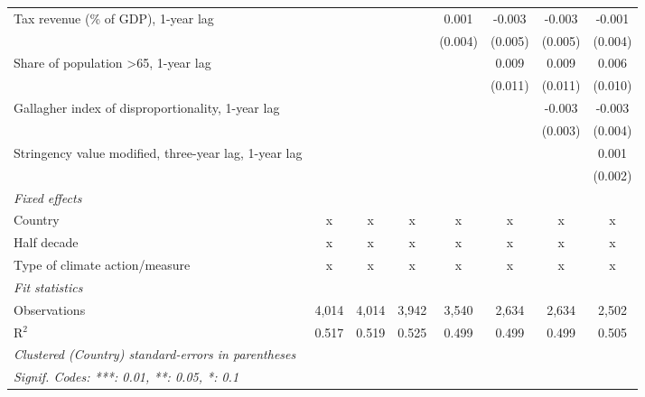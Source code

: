 \begin{tabular}{lccccccc}
   Tax revenue (\% of GDP), 1-year lag                              &               &              &               & 0.001       & -0.003  & -0.003  & -0.001\\   
                                                                    &               &              &               & (0.004)     & (0.005) & (0.005) & (0.004)\\   
   Share of population >65, 1-year lag                              &               &              &               &             & 0.009   & 0.009   & 0.006\\   
                                                                    &               &              &               &             & (0.011) & (0.011) & (0.010)\\   
   Gallagher index of disproportionality, 1-year lag                &               &              &               &             &         & -0.003  & -0.003\\   
                                                                    &               &              &               &             &         & (0.003) & (0.004)\\   
   Stringency value modified, three-year lag, 1-year lag            &               &              &               &             &         &         & 0.001\\   
                                                                    &               &              &               &             &         &         & (0.002)\\   
   \emph{Fixed effects}\\
   Country                                                          & x             & x            & x             & x           & x       & x       & x\\  
   Half decade                                                      & x             & x            & x             & x           & x       & x       & x\\  
   Type of climate action/measure                                   & x             & x            & x             & x           & x       & x       & x\\  
   \midrule \emph{Fit statistics}\\
   Observations                                                     & 4,014         & 4,014        & 3,942         & 3,540       & 2,634   & 2,634   & 2,502\\  
   R$^2$                                                            & 0.517         & 0.519        & 0.525         & 0.499       & 0.499   & 0.499   & 0.505\\  
   \midrule
   \multicolumn{8}{l}{\emph{Clustered (Country) standard-errors in parentheses}}\\
   \multicolumn{8}{l}{\emph{Signif. Codes: ***: 0.01, **: 0.05, *: 0.1}}\\
\end{tabular}
\par\endgroup


